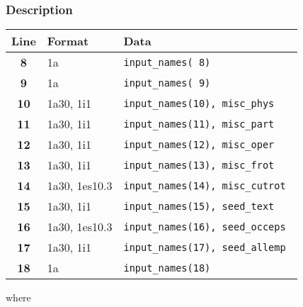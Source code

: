 \documentclass[a4paper,11pt]{article}
\begin{document}
\subsubsection*{Description}
\begin{center}
\begin{tabular}{|c|l|l|}
\hline
Line & Format & Data \\
\hline
 \textbf{ 8}   & 1a            & \tt input\_names( 8)               \\
 \textbf{ 9}   & 1a            & \tt input\_names( 9)               \\
 \textbf{10}   & 1a30, 1i1     & \tt input\_names(10), misc\_phys   \\
 \textbf{11}   & 1a30, 1i1     & \tt input\_names(11), misc\_part   \\
 \textbf{12}   & 1a30, 1i1     & \tt input\_names(12), misc\_oper   \\
 \textbf{13}   & 1a30, 1i1     & \tt input\_names(13), misc\_frot   \\
 \textbf{14}   & 1a30, 1es10.3 & \tt input\_names(14), misc\_cutrot \\
 \textbf{15}   & 1a30, 1i1     & \tt input\_names(15), seed\_text   \\
 \textbf{16}   & 1a30, 1es10.3 & \tt input\_names(16), seed\_occeps \\
 \textbf{17}   & 1a30, 1i1     & \tt input\_names(17), seed\_allemp \\
 \textbf{18}   & 1a            & \tt input\_names(18)               \\
\hline
\end{tabular}
\end{center}
where
\end{document}
